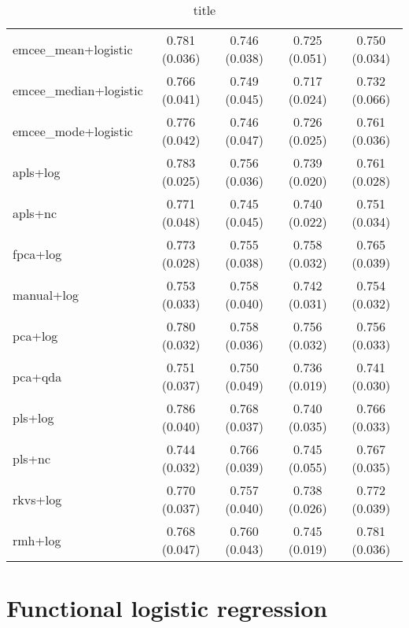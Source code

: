 \begin{table}[ht!]
\begin{tabular}{lcccc}
  emcee\_mean+logistic & 0.781 (0.036) &       0.746 (0.038) &      0.725 (0.051) & 0.750 (0.034) \\
emcee\_median+logistic & 0.766 (0.041) &       0.749 (0.045) &      0.717 (0.024) & 0.732 (0.066) \\
  emcee\_mode+logistic & 0.776 (0.042) &       0.746 (0.047) &      0.726 (0.025) & 0.761 (0.036) \\
             apls+log & 0.783 (0.025) &       0.756 (0.036) &      0.739 (0.020) & 0.761 (0.028) \\
              apls+nc & 0.771 (0.048) &       0.745 (0.045) &      0.740 (0.022) & 0.751 (0.034) \\
             fpca+log & 0.773 (0.028) &       0.755 (0.038) &      0.758 (0.032) & 0.765 (0.039) \\
           manual+log & 0.753 (0.033) &       0.758 (0.040) &      0.742 (0.031) & 0.754 (0.032) \\
              pca+log & 0.780 (0.032) &       0.758 (0.036) &      0.756 (0.032) & 0.756 (0.033) \\
              pca+qda & 0.751 (0.037) &       0.750 (0.049) &      0.736 (0.019) & 0.741 (0.030) \\
              pls+log & 0.786 (0.040) &       0.768 (0.037) &      0.740 (0.035) & 0.766 (0.033) \\
               pls+nc & 0.744 (0.032) &       0.766 (0.039) &      0.745 (0.055) & 0.767 (0.035) \\
             rkvs+log & 0.770 (0.037) &       0.757 (0.040) &      0.738 (0.026) & 0.772 (0.039) \\
              rmh+log & 0.768 (0.047) &       0.760 (0.043) &      0.745 (0.019) & 0.781 (0.036) \\
\bottomrule
\end{tabular}
  \caption{title}
\end{table}

\section*{Functional logistic regression}
